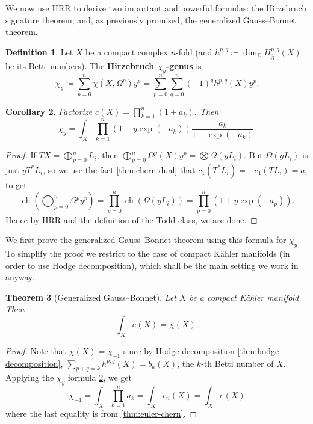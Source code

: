 \documentclass{report}
\theoremstyle{plain}
\newtheorem{theorem}{Theorem}[section]
\newtheorem{corollary}[theorem]{Corollary}
\theoremstyle{definition}
\newtheorem{definition}[theorem]{Definition}
\theoremstyle{remark}
\newcommand{\di}{\partial}
\newcommand{\bC}{\mathbb{C}}
\DeclareMathOperator{\ch}{ch}
\newcommand{\bdi}{\bar{\di}}
\begin{document}
We now use HRR to derive two important and powerful formulas: the
Hirzebruch signature theorem, and, as previously promised, the
generalized Gauss--Bonnet theorem.

\begin{definition}
  Let $X$ be a compact complex $n$-fold (and $h^{p,q} \coloneqq
  \dim_{\bC} H^{p,q}_{\bdi}(X)$ be its Betti numbers). The {\bf
    Hirzebruch $\chi_y$-genus} is
    \[ \chi_y \coloneqq \sum_{p=0}^n \chi(X, \Omega^p) y^p = \sum_{p=0}^n \sum_{q=0}^n (-1)^q h^{p,q}(X) y^p. \]
\end{definition}

\begin{corollary} \label{thm:chi-genus-formula}
  Factorize $c(X) = \prod_{k=1}^n (1 + a_k)$. Then
  \[ \chi_y = \int_X \prod_{k=1}^n (1 + y \exp(-a_k)) \frac{a_k}{1 - \exp(-a_k)}. \]
\end{corollary}

\begin{proof}
  If $TX = \bigoplus_{p=0}^n L_i$, then $\bigoplus_{p=0}^n
  \Omega^p(X)y^p = \bigotimes \Omega(yL_i)$. But $\Omega(yL_i)$ is
  just $yT^*L_i$, so we use the fact \ref{thm:chern-dual} that
  $c_1(T^*L_i) = -c_1(TL_i) = a_i$ to get
  \[ \ch\left(\bigoplus_{p=0}^n \Omega^p y^p\right) = \prod_{p=0}^n \ch(\Omega(yL_i)) = \prod_{p=0}^n (1 + y \exp(-a_p)). \]
  Hence by HRR and the definition of the Todd class, we are done.
\end{proof}

We first prove the generalized Gauss--Bonnet theorem using this
formula for $\chi_y$. To simplify the proof we restrict to the case of
compact K\"ahler manifolds (in order to use Hodge decomposition),
which shall be the main setting we work in anyway.

\begin{theorem}[Generalized Gauss--Bonnet] \label{thm:generalized-gauss-bonnet}
  Let $X$ be a compact K\"ahler manifold. Then
  \[ \int_X e(X) = \chi(X). \]
\end{theorem}

\begin{proof}
  Note that $\chi(X) = \chi_{-1}$ since by Hodge decomposition
  \ref{thm:hodge-decomposition}, $\sum_{p+q=k} h^{p,q}(X) = b_k(X)$,
  the $k$-th Betti number of $X$. Applying the $\chi_y$ formula
  \ref{thm:chi-genus-formula}, we get
  \[ \chi_{-1} = \int_X \prod_{k=1}^n a_k = \int_X c_n(X) = \int_X e(X) \]
  where the last equality is from \ref{thm:euler-chern}.
\end{proof}
\end{document}
